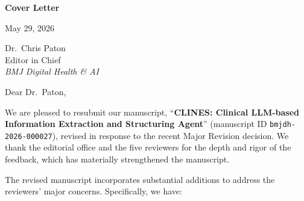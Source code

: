 \documentclass[11pt,letterpaper]{article}
\begin{document}
\thispagestyle{empty}

\begin{center}
{\Large\bfseries Cover Letter}
\end{center}
\vspace{1em}

\noindent May 29, 2026

\vspace{1.5em}
\noindent
Dr.\ Chris Paton\\
Editor in Chief\\
\textit{BMJ Digital Health \& AI}

\vspace{1em}
\noindent Dear Dr.\ Paton,

\bigskip

We are pleased to resubmit our manuscript, ``\textbf{CLINES: Clinical LLM-based Information Extraction and Structuring Agent}'' (manuscript ID \texttt{bmjdh-2026-000027}), revised in response to the recent Major Revision decision. We thank the editorial office and the five reviewers for the depth and rigor of the feedback, which has materially strengthened the manuscript.

\medskip

The revised manuscript incorporates substantial additions to address the reviewers' major concerns. Specifically, we have:
\end{document}
